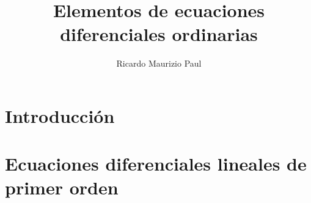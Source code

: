\documentclass[a4paper, twoside, 11pt]{report}
\title{Elementos de ecuaciones diferenciales ordinarias}
\author{Ricardo Maurizio Paul}
\begin{document}
\maketitle

\chapter{Introducción}


\chapter{Ecuaciones diferenciales lineales de primer orden}

\end{document}

